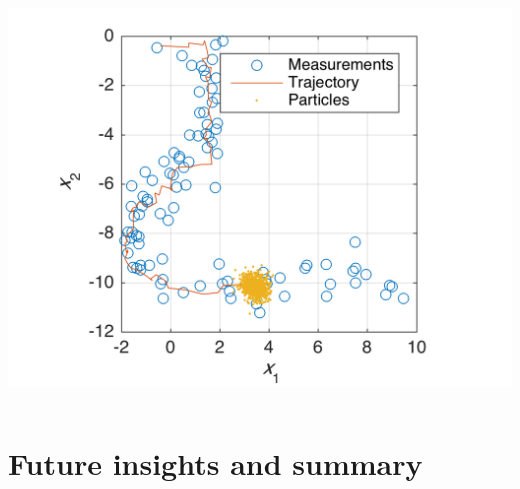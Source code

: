 \documentclass[xcolor=svgnames,english,presentation]{beamer}
\begin{document}
\begin{frame}
\begin{columns}
\begin{column}{0.35\textwidth}
  \includegraphics[width=\columnwidth]{pf_est}
  \end{column}
  \end{columns}
\end{frame}


\section{Future insights and summary}
\end{document}

